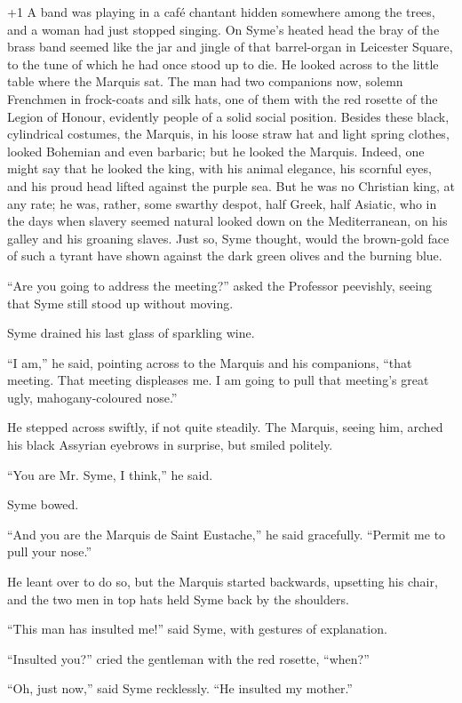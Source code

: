 \looseness+1
A band was playing in a café chantant hidden somewhere among the trees, and a woman had just stopped singing. On Syme’s heated head the bray of the brass band seemed like the jar and jingle of that barrel-organ in Leicester Square, to the tune of which he had once stood up to die. He looked across to the little table where the Marquis sat. The man had two companions now, solemn Frenchmen in frock-coats and silk hats, one of them with the red rosette of the Legion of Honour, evidently people of a solid social position. Besides these black, cylindrical costumes, the Marquis, in his loose straw hat and light spring clothes, looked Bohemian and even barbaric; but he looked the Marquis. Indeed, one might say that he looked the king, with his animal elegance, his scornful eyes, and his proud head lifted against the purple sea. But he was no Christian king, at any rate; he was, rather, some swarthy despot, half Greek, half Asiatic, who in the days when slavery seemed natural looked down on the Mediterranean, on his galley and his groaning slaves. Just so, Syme thought, would the brown-gold face of such a tyrant have shown against the dark green olives and the burning blue.

“Are you going to address the meeting?” asked the Professor peevishly, seeing that Syme still stood up without moving.

Syme drained his last glass of sparkling wine.

“I am,” he said, pointing across to the Marquis and his companions, “that meeting. That meeting displeases me. I am going to pull that meeting’s great ugly, mahogany-coloured nose.”

He stepped across swiftly, if not quite steadily. The Marquis, seeing him, arched his black Assyrian eyebrows in surprise, but smiled politely.

“You are Mr. Syme, I think,” he said.

Syme bowed.

“And you are the Marquis de Saint Eustache,” he said gracefully. “Permit me to pull your nose.”

He leant over to do so, but the Marquis started backwards, upsetting his chair, and the two men in top hats held Syme back by the shoulders.

“This man has insulted me!” said Syme, with gestures of explanation.

“Insulted you?” cried the gentleman with the red rosette, “when?”

“Oh, just now,” said Syme recklessly. “He insulted my mother.”

